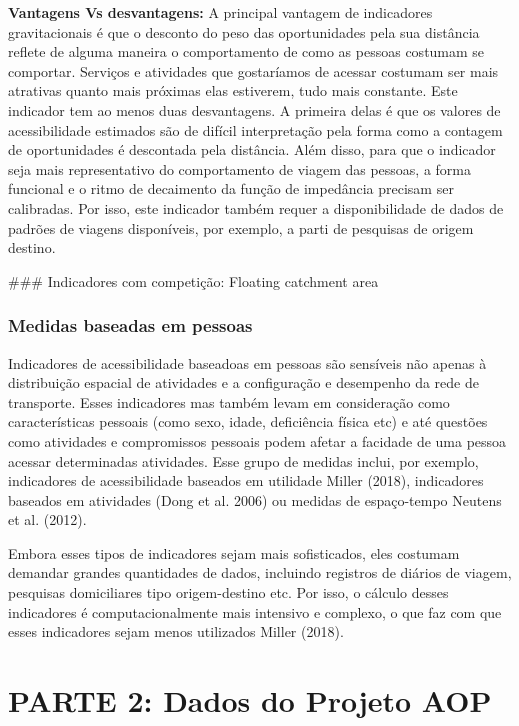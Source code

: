 \documentclass[
  letterpaper,
  DIV=11,
  numbers=noendperiod]{scrreprt}
\begin{document}
\textbf{Vantagens Vs desvantagens:} A principal vantagem de indicadores
gravitacionais é que o desconto do peso das oportunidades pela sua
distância reflete de alguma maneira o comportamento de como as pessoas
costumam se comportar. Serviços e atividades que gostaríamos de acessar
costumam ser mais atrativas quanto mais próximas elas estiverem, tudo
mais constante. Este indicador tem ao menos duas desvantagens. A
primeira delas é que os valores de acessibilidade estimados são de
difícil interpretação pela forma como a contagem de oportunidades é
descontada pela distância. Além disso, para que o indicador seja mais
representativo do comportamento de viagem das pessoas, a forma funcional
e o ritmo de decaimento da função de impedância precisam ser calibradas.
Por isso, este indicador também requer a disponibilidade de dados de
padrões de viagens disponíveis, por exemplo, a parti de pesquisas de
origem destino.

\#\#\# Indicadores com competição: Floating catchment area

\hypertarget{medidas-baseadas-em-pessoas}{%
\section{Medidas baseadas em
pessoas}\label{medidas-baseadas-em-pessoas}}

Indicadores de acessibilidade baseadoas em pessoas são sensíveis não
apenas à distribuição espacial de atividades e a configuração e
desempenho da rede de transporte. Esses indicadores mas também levam em
consideração como características pessoais (como sexo, idade,
deficiência física etc) e até questões como atividades e compromissos
pessoais podem afetar a facidade de uma pessoa acessar determinadas
atividades. Esse grupo de medidas inclui, por exemplo, indicadores de
acessibilidade baseados em utilidade Miller (2018), indicadores baseados
em atividades (Dong et al. 2006) ou medidas de espaço-tempo Neutens et
al. (2012).

Embora esses tipos de indicadores sejam mais sofisticados, eles costumam
demandar grandes quantidades de dados, incluindo registros de diários de
viagem, pesquisas domiciliares tipo origem-destino etc. Por isso, o
cálculo desses indicadores é computacionalmente mais intensivo e
complexo, o que faz com que esses indicadores sejam menos utilizados
Miller (2018).

\part{PARTE 2: Dados do Projeto AOP}
\end{document}
